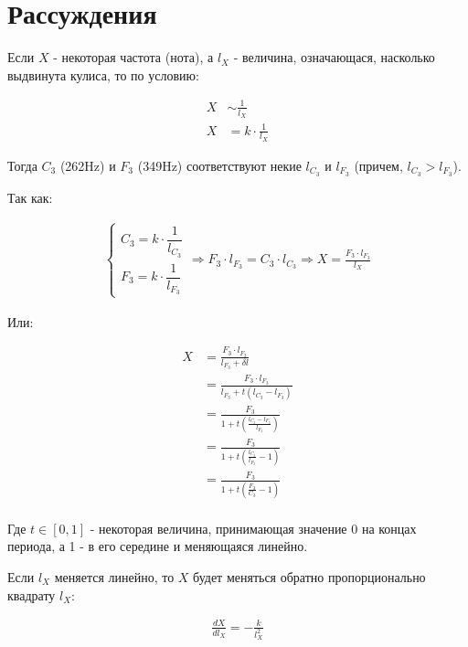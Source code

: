 \documentclass[a4paper,12pt]{report}
\begin{document}
    \section{Рассуждения}
    
    Если $X$ - некоторая частота (нота), а $l_X$ - величина, означающася, насколько выдвинута кулиса, то по условию:
    
    \begin{align*}
        X &\sim \frac{1}{l_X} \\
        X &= k\cdot\frac{1}{l_X}
    \end{align*}
    
    Тогда $C_3$ (262Hz) и $F_3$ (349Hz) соответствуют некие $l_{C_3}$ и $l_{F_3}$ (причем, $l_{C_3} > l_{F_3}$).
    
    Так как:
    
    \begin{align*}
        \begin{cases}
            C_3 = k \cdot \dfrac{1}{l_{C_3}} \\
            F_3 = k \cdot \dfrac{1}{l_{F_3}}
        \end{cases}
        \Rightarrow
        F_3\cdot l_{F_3} = C_3\cdot l_{C_3}
        \Rightarrow
        X = \frac{F_3\cdot l_{F_3}}{l_X}
    \end{align*}
    
    Или:
    
    \begin{align*}
        X &= \frac{F_3\cdot l_{F_3}}{l_{F_3} + \delta l} \\
          &= \frac{F_3\cdot l_{F_3}}{l_{F_3} + t(l_{C_3} - l_{F_3})} \\
          &= \frac{F_3}{1 + t\left(\frac{l_{C_3} - l_{F_3}}{l_{F_3}}\right)} \\
          &= \frac{F_3}{1 + t\left(\frac{l_{C_3}}{l_{F_3}} - 1\right)} \\
          &= \frac{F_3}{1 + t\left(\frac{F_3}{C_3} - 1\right)} \\
    \end{align*}
    
    Где $t \in [0,1]$ - некоторая величина, принимающая значение 0 на концах периода, а 1 - в его середине и меняющаяся линейно.
    
    Если $l_X$ меняется линейно, то $X$ будет меняться обратно пропорционально квадрату $l_X$:
    
    \begin{align*}
        \frac{d X}{d l_X} = -\frac{k}{l_X^2}
    \end{align*}
    
\end{document}
